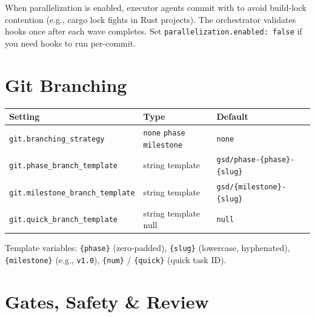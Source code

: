 \documentclass[10pt,letterpaper]{article}
\begin{document}
\begin{gsdwarning}
When parallelization is enabled, executor agents commit with  to avoid build-lock contention (e.g., cargo lock fights in Rust projects). The orchestrator validates hooks once after each wave completes. Set \texttt{parallelization.enabled: false} if you need hooks to run per-commit.
\end{gsdwarning}

\section{Git Branching}

\begin{longtable}{@{}l l l@{}}
\toprule
\textbf{\footnotesize Setting} & \textbf{\footnotesize Type} & \textbf{\footnotesize Default} \\
\midrule
\endhead
\texttt{git.branching\_strategy} & \texttt{none} \textbar{} \texttt{phase} \textbar{} \texttt{milestone} & \texttt{none} \\
\texttt{git.phase\_branch\_template} & string template & \texttt{gsd/phase-\{phase\}-\{slug\}} \\
\texttt{git.milestone\_branch\_template} & string template & \texttt{gsd/\{milestone\}-\{slug\}} \\
\texttt{git.quick\_branch\_template} & string template \textbar{} null & \texttt{null} \\
\bottomrule
\end{longtable}

Template variables: \texttt{\{phase\}} (zero-padded), \texttt{\{slug\}} (lowercase, hyphenated), \texttt{\{milestone\}} (e.g., \texttt{v1.0}), \texttt{\{num\}} / \texttt{\{quick\}} (quick task ID).

\section{Gates, Safety \& Review}
\end{document}

